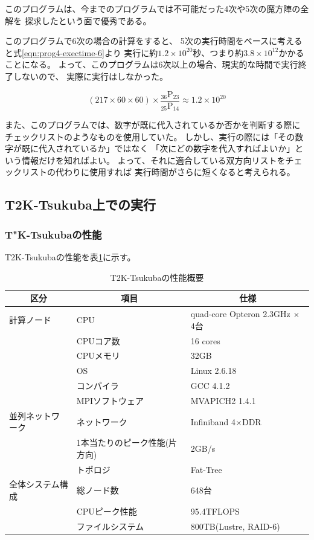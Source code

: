 このプログラムは、今までのプログラムでは不可能だった4次や5次の魔方陣の全解を
探求したという面で優秀である。

このプログラムで6次の場合の計算をすると、
5次の実行時間をベースに考えると式\ref{eqn:prog4-exectime-6}より
実行に約$1.2 \times 10^{20}$秒、つまり約$3.8 \times 10^{12}$かかることになる。
よって、このプログラムは6次以上の場合、現実的な時間で実行終了しないので、
実際に実行はしなかった。

\begin{equation} \label{eqn:prog4-exectime-6}
(217 \times 60 \times 60) \times \frac{_{36} \mathrm{P} _{23}}{_{25} \mathrm{P} _{14}} \approx  1.2 \times 10^{20}
\end{equation}

また、このプログラムでは、数字が既に代入されているか否かを判断する際に
チェックリストのようなものを使用していた。
しかし、実行の際には「その数字が既に代入されているか」ではなく
「次にどの数字を代入すればよいか」という情報だけを知ればよい。
よって、それに適合している双方向リストをチェックリストの代わりに使用すれば
実行時間がさらに短くなると考えられる。


\subsection{T2K-Tsukuba上での実行}
\subsubsection{T"K-Tsukubaの性能}
T2K-Tsukubaの性能を表\ref{tb:t2k-perf}に示す。

\begin{table}[htb]
	\begin{center}
	\begin{tabular}{|l|l|l|}
\hline \hline
\multicolumn{1}{|c|}{区分} & \multicolumn{1}{|c|}{項目} & \multicolumn{1}{|c|}{仕様} \\
\hline \hline
計算ノード & CPU & quad-core Opteron 2.3GHz $\times$ 4台 \\
& CPUコア数 & 16 cores \\
& CPUメモリ & 32GB \\
& OS & Linux 2.6.18 \\
& コンパイラ & GCC 4.1.2 \\
& MPIソフトウェア & MVAPICH2 1.4.1 \\
\hline
並列ネットワーク & ネットワーク & Infiniband 4$\times$DDR \\
& 1本当たりのピーク性能(片方向) & 2GB/s \\
& トポロジ & Fat-Tree \\\hline
全体システム構成 & 総ノード数 & 648台 \\
& CPUピーク性能 & 95.4TFLOPS \\
& ファイルシステム & 800TB(Lustre, RAID-6) \\\hline
	\end{tabular}
	\end{center}
 	\caption{T2K-Tsukubaの性能概要}
	\label{tb:t2k-perf}
\end{table}


